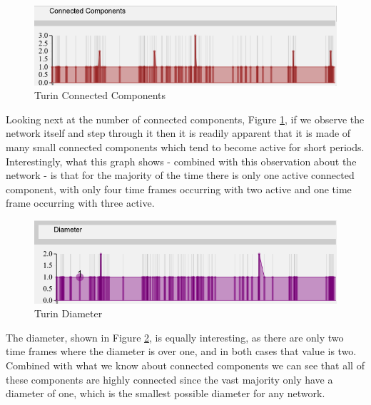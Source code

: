 \begin{center}
\end{center}  

\begin{figure}[h!]
  \begin{center}
  \includegraphics[trim={0 0 0 0}, width=140mm]{./Figures/TurinConnectedComponents.png}
  \caption{Turin Connected Components}
  \label{fig:TurinConnectedComponents}
  \end{center}
\end{figure}
Looking next at the number of connected components, Figure \ref{fig:TurinConnectedComponents}, if we observe the network itself and step through it then it is readily apparent that it is made of many small connected components which tend to become active for short periods. Interestingly, what this graph shows - combined with this observation about the network - is that for the majority of the time there is only one active connected component, with only four time frames occurring with two active and one time frame occurring with three active.

\begin{figure}[h!]
  \begin{center}
  \includegraphics[trim={0 0 0 0}, width=140mm]{./Figures/TurinDiameter.png}
  \caption{Turin Diameter}
  \label{fig:TurinDiameter}
  \end{center}
\end{figure}
The diameter, shown in Figure \ref{fig:TurinDiameter}, is equally interesting, as there are only two time frames where the diameter is over one, and in both cases that value is two. Combined with what we know about connected components we can see that all of these components are highly connected since the vast majority only have a diameter of one, which is the smallest possible diameter for any network.
    
